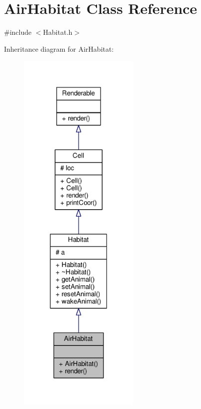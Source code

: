 \hypertarget{classAirHabitat}{}\section{Air\+Habitat Class Reference}
\label{classAirHabitat}


{\ttfamily \#include $<$Habitat.\+h$>$}



Inheritance diagram for Air\+Habitat\+:
\nopagebreak
\begin{figure}[H]
\begin{center}
\leavevmode
\includegraphics[width=165pt]{classAirHabitat__inherit__graph}
\end{center}
\end{figure}


